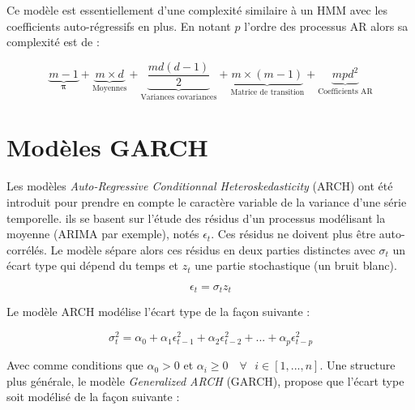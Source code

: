 \documentclass[12pt, french]{report}
\begin{document}

Ce modèle est essentiellement d'une complexité similaire à un HMM avec les coefficients auto-régressifs en plus. En notant $p$ l'ordre des processus AR alors sa complexité est de :

\begin{equation}
\underbrace{m-1}_\text{$\bm{\pi}$}  + \underbrace{m \times d}_\text{Moyennes}  +  \underbrace{\frac{md \left(d - 1\right)}{2}}_\text{Variances covariances} + \underbrace{m \times (m-1)}_\text{Matrice de transition} + \underbrace{mpd^2}_\text{Coefficients AR} 
\label{eq:Model_MSAR_ParamNumber_MultiD} 
\end{equation} 


\section{Modèles GARCH}
Les modèles \textit{Auto-Regressive Conditionnal Heteroskedasticity} (ARCH) ont été introduit pour prendre en compte le caractère variable de la variance d'une série temporelle. ils se basent sur l'étude des résidus d'un processus modélisant la moyenne (ARIMA par exemple), notés $\epsilon_t$. Ces résidus ne doivent plus être auto-corrélés. Le modèle sépare alors ces résidus en deux parties distinctes avec $\sigma_t$ un écart type qui dépend du temps et $z_t$ une partie stochastique (un bruit blanc).

\begin{equation}
\epsilon_t = \sigma_t  z_t
\end{equation}

Le modèle ARCH modélise l'écart type de la façon suivante :

\begin{equation}
\sigma_t^2 = \alpha_0 + \alpha_1  \epsilon_{t-1}^2 + \alpha_2  \epsilon_{t-2}^2 + ... + \alpha_p  \epsilon_{t-p}^2 
\label{ARCH}
\end{equation}

Avec comme conditions que $\alpha_0 > 0$ et $\alpha_i \geq 0 \quad \forall \text{ } i \in [1,...,n] $. Une structure plus générale, le modèle \textit{Generalized ARCH} (GARCH), propose que l’écart type soit modélisé de la façon suivante :
\end{document}
